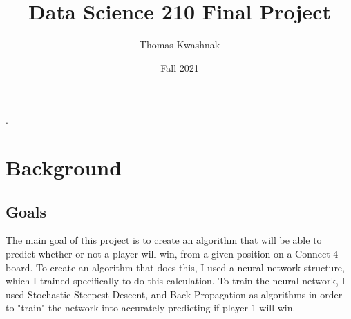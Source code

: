 \documentclass[10pt]{article}
\title{Data Science 210 Final Project}
\author{Thomas Kwashnak}
\date{Fall 2021}
\begin{document}
\maketitle
\setlength{\parindent}{0pt}.
\setlength{\parskip}{\baselineskip}
\lstset{numbers=left, numberstyle=\footnotesize, frame=l} 

\tableofcontents
\newpage

\section{Background}
\subsection{Goals}
The main goal of this project is to create an algorithm that will be able to predict whether or not a player will win, from a given position on a Connect-4 board. To create an algorithm that does this, I used a neural network structure, which I trained specifically to do this calculation. To train the neural network, I used Stochastic Steepest Descent, and Back-Propagation as algorithms in order to "train" the network into accurately predicting if player 1 will win.
\end{document}
